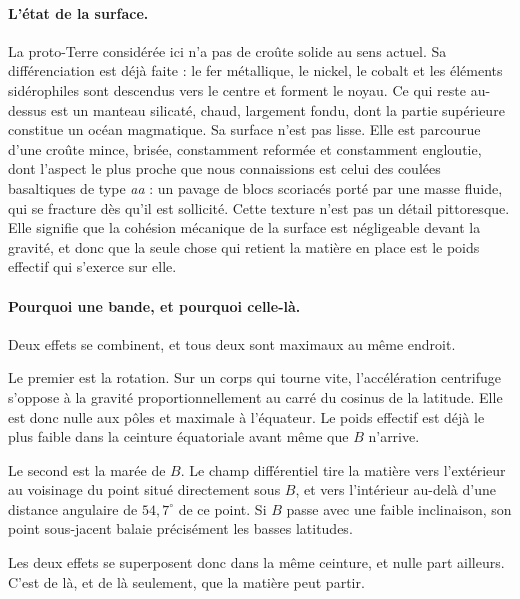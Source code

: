 \documentclass[11pt,a4paper,openany]{report}
\begin{document}
\paragraph{L'état de la surface.} La proto-Terre considérée ici n'a pas de croûte solide au sens
actuel. Sa différenciation est déjà faite : le fer métallique, le nickel, le cobalt et les éléments
sidérophiles sont descendus vers le centre et forment le noyau. Ce qui reste au-dessus est un
manteau silicaté, chaud, largement fondu, dont la partie supérieure constitue un océan magmatique.
Sa surface n'est pas lisse. Elle est parcourue d'une croûte mince, brisée, constamment reformée et
constamment engloutie, dont l'aspect le plus proche que nous connaissions est celui des coulées
basaltiques de type \emph{aa} : un pavage de blocs scoriacés porté par une masse fluide, qui se
fracture dès qu'il est sollicité. Cette texture n'est pas un détail pittoresque. Elle signifie que
la cohésion mécanique de la surface est négligeable devant la gravité, et donc que la seule chose
qui retient la matière en place est le poids effectif qui s'exerce sur elle.

\paragraph{Pourquoi une bande, et pourquoi celle-là.} Deux effets se combinent, et tous deux sont
maximaux au même endroit.

Le premier est la rotation. Sur un corps qui tourne vite, l'accélération centrifuge s'oppose à la
gravité proportionnellement au carré du cosinus de la latitude. Elle est donc nulle aux pôles et
maximale à l'équateur. Le poids effectif est déjà le plus faible dans la ceinture équatoriale avant
même que $B$ n'arrive.

Le second est la marée de $B$. Le champ différentiel tire la matière vers l'extérieur au voisinage
du point situé directement sous $B$, et vers l'intérieur au-delà d'une distance angulaire de
$54{,}7^\circ$ de ce point. Si $B$ passe avec une faible inclinaison, son point sous-jacent balaie
précisément les basses latitudes.

Les deux effets se superposent donc dans la même ceinture, et nulle part ailleurs. C'est de là, et
de là seulement, que la matière peut partir.
\end{document}
